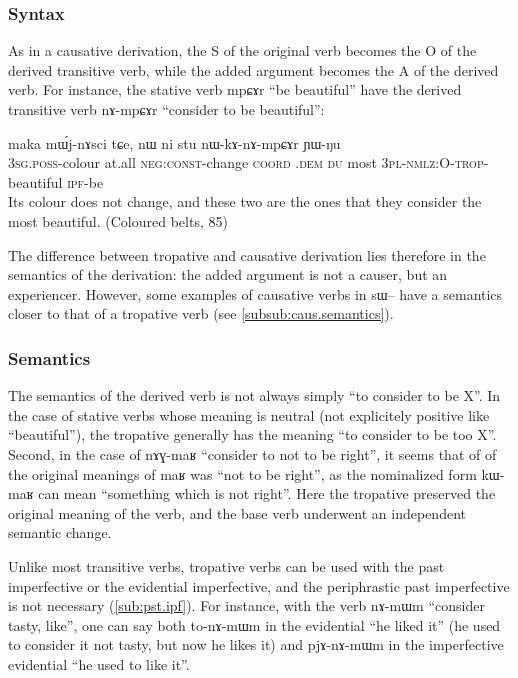 \documentclass[oldfontcommands,oneside,a4paper,11pt]{memoir}
\newcommand{\ipa}[1]{{\phon #1}} %
\newcommand{\coord}{\textsc{coord}}
\newcommand{\const}{\textsc{const}}
\newcommand{\dem}{\textsc{dem}}
\newcommand{\du}{\textsc{du}}
\newcommand{\ipf}{\textsc{ipf}}
\newcommand{\negat}{\textsc{neg}}
\newcommand{\nmlz}{\textsc{nmlz}}
\newcommand{\pl}{\textsc{pl}}
\newcommand{\poss}{\textsc{poss}}
\newcommand{\sg}{\textsc{sg}}
\newcommand{\trop}{\textsc{trop}}
\begin{document}
\subsubsection{Syntax}

As in a causative derivation, the S of the original verb becomes the O of the derived transitive verb, while the added argument  becomes the A of the derived verb. For instance, the stative verb  \ipa{mpɕɤr} ``be beautiful'' have the derived transitive verb \ipa{nɤ-mpɕɤr} ``consider to be beautiful'':


 \begin{exe}
\ex
\gll  \ipa{ɯ-mdoʁ} 	\ipa{maka} 	\ipa{mɯ́j-nɤsci} 	\ipa{tɕe,} 	\ipa{nɯ} 	\ipa{ni} 	\ipa{stu} 	\ipa{nɯ-kɤ-nɤ-mpɕɤr} 	\ipa{ɲɯ-ŋu} 
\\
3\sg{}.\poss{}-colour at.all \negat{}:\const{}-change \coord{} \distal{}.\dem{} \du{} most 3\pl{}-\nmlz{}:O-\trop{}-beautiful \ipf{}-be \\
 \glt  Its colour does not change, and these two are the ones that they consider the most beautiful. (Coloured belts, 85)
\end{exe} 

The difference between tropative and causative derivation lies therefore in the semantics of the derivation: the added argument is not a causer, but an \ipa{experiencer}. However, some examples of causative verbs in \ipa{sɯ}-- have a semantics closer to that of a tropative verb (see \ref{subsub:caus.semantics}).

\subsubsection{Semantics}
The semantics of the derived verb is not always simply ``to consider to be X''. In the case of stative verbs whose meaning is neutral (not explicitely positive like ``beautiful''), the tropative generally has the meaning ``to consider to be too X''. Second, in the case of \ipa{nɤɣ-maʁ} ``consider to not to be right'', it seems that of of the original meanings of   \ipa{maʁ}  was ``not to be right'', as the nominalized form \ipa{kɯ-maʁ} can mean ``something which is not right''. Here the tropative preserved the original meaning of the verb, and the base verb underwent an independent semantic change.

Unlike most transitive verbs, tropative verbs can be used with the past imperfective or the evidential imperfective, and the periphrastic past imperfective is not necessary (\ref{sub:pst.ipf}). For instance, with the verb \ipa{nɤ-mɯm} ``consider tasty, like'', one can say both \ipa{to-nɤ-mɯm} in the evidential  ``he liked it'' (he used to consider it not tasty, but now he likes it) and \ipa{pjɤ-nɤ-mɯm} in the imperfective evidential  ``he used to like it''.
\end{document}
